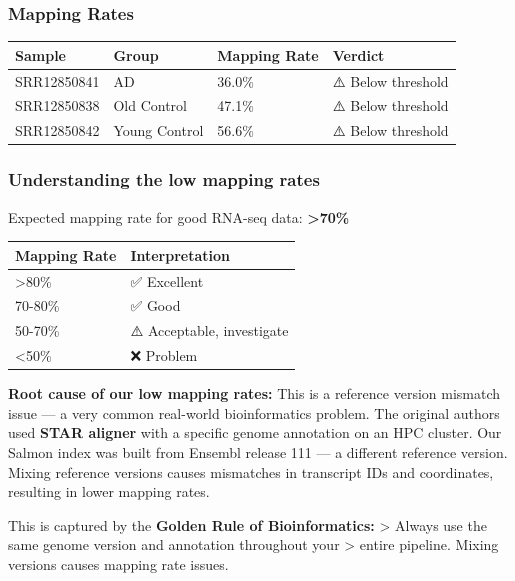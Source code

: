 \documentclass[
]{article}
\begin{document}
\subsubsection{Mapping Rates}\label{mapping-rates}

\begin{longtable}[]{@{}llll@{}}
\toprule\noalign{}
Sample & Group & Mapping Rate & Verdict \\
\midrule\noalign{}
\endhead
\bottomrule\noalign{}
\endlastfoot
SRR12850841 & AD & 36.0\% & ⚠️ Below threshold \\
SRR12850838 & Old Control & 47.1\% & ⚠️ Below threshold \\
SRR12850842 & Young Control & 56.6\% & ⚠️ Below threshold \\
\end{longtable}

\subsubsection{Understanding the low mapping
rates}\label{understanding-the-low-mapping-rates}

Expected mapping rate for good RNA-seq data: \textbf{\textgreater70\%}

\begin{longtable}[]{@{}ll@{}}
\toprule\noalign{}
Mapping Rate & Interpretation \\
\midrule\noalign{}
\endhead
\bottomrule\noalign{}
\endlastfoot
\textgreater80\% & ✅ Excellent \\
70-80\% & ✅ Good \\
50-70\% & ⚠️ Acceptable, investigate \\
\textless50\% & ❌ Problem \\
\end{longtable}

\textbf{Root cause of our low mapping rates:} This is a reference
version mismatch issue --- a very common real-world bioinformatics
problem. The original authors used \textbf{STAR aligner} with a specific
genome annotation on an HPC cluster. Our Salmon index was built from
Ensembl release 111 --- a different reference version. Mixing reference
versions causes mismatches in transcript IDs and coordinates, resulting
in lower mapping rates.

This is captured by the \textbf{Golden Rule of Bioinformatics:}
\textgreater{} Always use the same genome version and annotation
throughout your \textgreater{} entire pipeline. Mixing versions causes
mapping rate issues.
\end{document}
